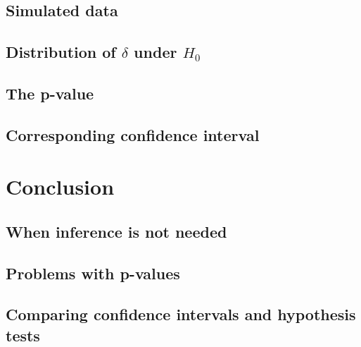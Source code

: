 \documentclass[12pt, krantz2,]{krantz}
\begin{document}
\hypertarget{simulated-data}{%
\subsection{Simulated data}\label{simulated-data}}

\hypertarget{distribution-of-delta-under-h_0}{%
\subsection{\texorpdfstring{Distribution of \(\delta\) under \(H_0\)}{Distribution of \textbackslash{}delta under H\_0}}\label{distribution-of-delta-under-h_0}}

\hypertarget{the-p-value}{%
\subsection{The p-value}\label{the-p-value}}

\hypertarget{corresponding-confidence-interval-1}{%
\subsection{Corresponding confidence interval}\label{corresponding-confidence-interval-1}}

\hypertarget{conclusion-6}{%
\section{Conclusion}\label{conclusion-6}}

\hypertarget{when-inference-is-not-needed}{%
\subsection{When inference is not needed}\label{when-inference-is-not-needed}}

\hypertarget{problems-with-p-values}{%
\subsection{Problems with p-values}\label{problems-with-p-values}}

\hypertarget{comparing-confidence-intervals-and-hypothesis-tests}{%
\subsection{Comparing confidence intervals and hypothesis tests}\label{comparing-confidence-intervals-and-hypothesis-tests}}
\end{document}
